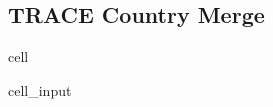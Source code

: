 \documentclass[letterpaper,10pt,english]{jupyterBook}
\begin{document}
\subsection{TRACE Country Merge}
\label{\detokenize{notebooks/geo_coding:trace-country-merge}}
\begin{sphinxuseclass}{cell}\begin{sphinxVerbatimInput}

\begin{sphinxuseclass}{cell_input}
\begin{sphinxVerbatim}[commandchars=\\\{\}]
     
\end{sphinxVerbatim}

\end{sphinxuseclass}\end{sphinxVerbatimInput}

\end{sphinxuseclass}
\end{document}
